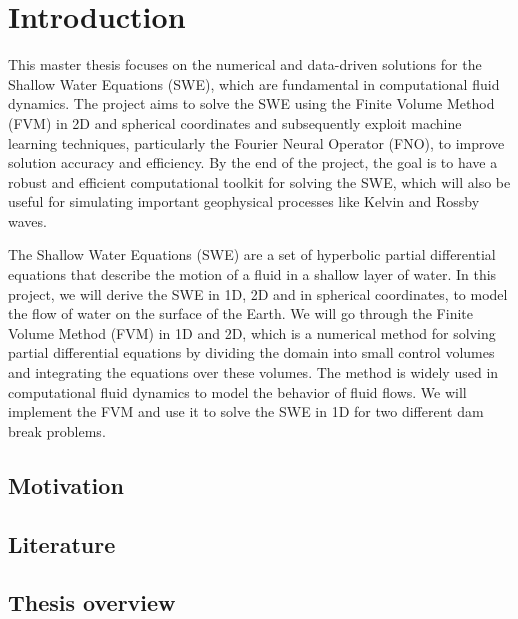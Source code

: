 \chapter{Introduction}

This master thesis focuses on the numerical and data-driven solutions for the Shallow Water Equations (SWE), which are fundamental in computational fluid dynamics.
The project aims to solve the SWE using the Finite Volume Method (FVM) in 2D and spherical coordinates and subsequently exploit machine learning techniques, particularly the Fourier Neural Operator (FNO), to improve solution accuracy and efficiency.
By the end of the project, the goal is to have a robust and efficient computational toolkit for solving the SWE, which will also be useful for simulating important geophysical processes like Kelvin and Rossby waves. 

The Shallow Water Equations (SWE) are a set of hyperbolic partial differential equations that describe the motion of a fluid in a shallow layer of water.
In this project, we will derive the SWE in 1D, 2D and in spherical coordinates, to model the flow of water on the surface of the Earth.
We will go through the Finite Volume Method (FVM) in 1D and 2D, which is a numerical method for solving partial differential equations by dividing the domain into small control volumes and integrating the equations over these volumes.
The method is widely used in computational fluid dynamics to model the behavior of fluid flows.
We will implement the FVM and use it to solve the SWE in 1D for two different dam break problems. 


\section{Motivation}

\section{Literature}

\section{Thesis overview}




